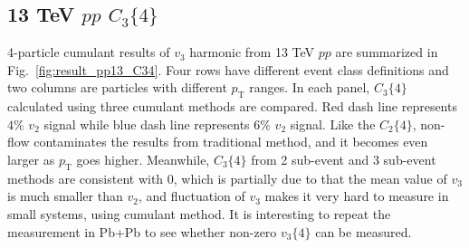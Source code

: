 \subsection{13 TeV $pp$ $C_{3}\{4\}$}
4-particle cumulant results of $v_{3}$ harmonic from 13 TeV $pp$ are summarized in Fig.~\ref{fig:result_pp13_C34}. Four rows have different event class definitions and two columns are particles with different $p_{\text{T}}$ ranges. In each panel, $C_{3}\{4\}$ calculated using three cumulant methods are compared. Red dash line represents $4\%$ $v_{2}$ signal while blue dash line represents $6\%$ $v_{2}$ signal. Like the $C_{2}\{4\}$, non-flow contaminates the results from traditional method, and it becomes even larger as $p_{\text{T}}$ goes higher. Meanwhile, $C_{3}\{4\}$ from 2 sub-event and 3 sub-event methods are consistent with 0, which is partially due to that the mean value of $v_{3}$ is much smaller than $v_{2}$, and fluctuation of $v_{3}$ makes it very hard to measure in small systems, using cumulant method. It is interesting to repeat the measurement in Pb+Pb to see whether non-zero $v_{3}\{4\}$ can be measured.
